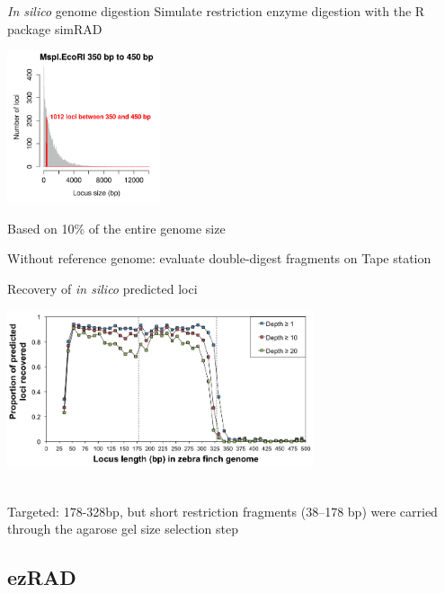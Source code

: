 \documentclass[presentation]{beamer}
\begin{document}
\begin{frame}[label=sec-2-2-7]{\emph{In silico} genome digestion}
Simulate restriction enzyme digestion with the R package simRAD \citep{Lepais2014}
\begin{center}
\includegraphics[width=4.5cm]{MspIEcoRI350to450.png}

\small{Based on 10\% of the entire genome size}
\end{center}
Without reference genome: evaluate double-digest fragments on Tape station
\end{frame}

\begin{frame}[label=sec-2-2-8]{Recovery of \emph{in silico} predicted loci}
\begin{center}
\includegraphics[width=9cm]{DaCosta2014Fig1a.png}

 \tiny{\citep{Dacosta2014}}\\
\small{Targeted: 178-328bp, but short restriction fragments (38–178 bp) were carried through the agarose gel size selection step}
 \end{center}
\end{frame}

\subsection{ezRAD}
\label{sec-2-3}
\end{document}
